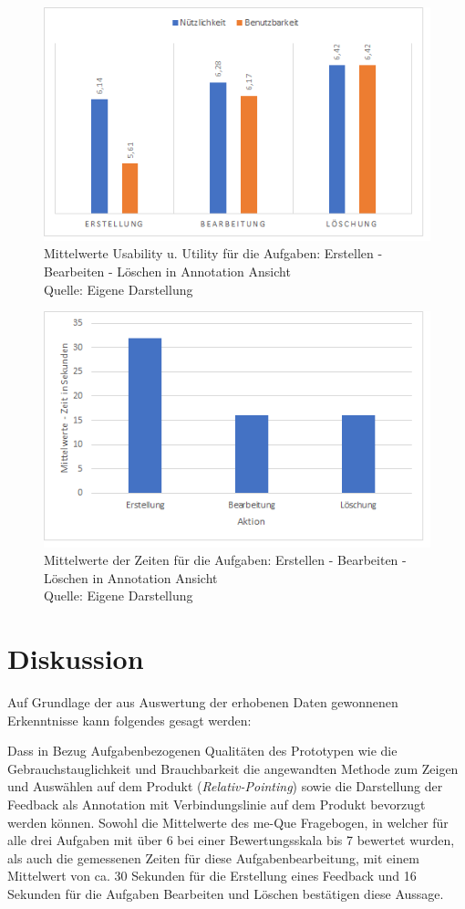 \begin{figure}[H]
	\centering
	\includegraphics[width=.8\textwidth]{resources/evaluation/MittelWerteUsability.png}
	\caption{Mittelwerte Usability u. Utility für die Aufgaben: Erstellen - Bearbeiten - Löschen in Annotation Ansicht \\Quelle: Eigene Darstellung}
	\label{img:mwUsability}
\end{figure}

\begin{figure}[H]
	\centering
	\includegraphics[width=.8\textwidth]{resources/evaluation/mittelwerte_alle_aktionen.png}
	\caption{Mittelwerte der Zeiten für die Aufgaben: Erstellen - Bearbeiten - Löschen in Annotation Ansicht \\Quelle: Eigene Darstellung}
	\label{img:mwTimes}
\end{figure}

\section{Diskussion}

Auf Grundlage der aus Auswertung der erhobenen Daten gewonnenen Erkenntnisse kann folgendes gesagt werden:

Dass in Bezug Aufgabenbezogenen Qualitäten des Prototypen wie die Gebrauchstauglichkeit und Brauchbarkeit die angewandten Methode zum Zeigen und Auswählen auf dem Produkt (\textit{Relativ-Pointing})
sowie die Darstellung der Feedback als Annotation mit Verbindungslinie auf dem Produkt bevorzugt werden können. Sowohl die Mittelwerte des me-Que Fragebogen, in welcher für alle drei Aufgaben mit über 6 bei 
einer Bewertungsskala bis 7 bewertet wurden, als auch die gemessenen Zeiten für diese Aufgabenbearbeitung, mit einem Mittelwert von ca. 30 Sekunden für die Erstellung eines Feedback und 16 Sekunden für die 
Aufgaben Bearbeiten und Löschen bestätigen diese Aussage. 

